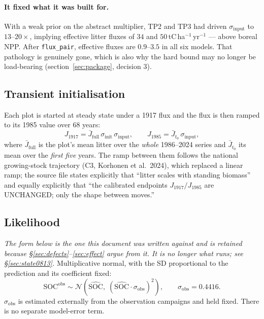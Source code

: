 \documentclass[11pt]{article}
\newcommand{\sinit}{\sigma_{\mathrm{init}}}
\newcommand{\sinput}{\sigma_{\mathrm{input}}}
\newcommand{\sobs}{\sigma_{\mathrm{obs}}}
\newcommand{\Jfull}{\bar{J}_{\mathrm{full}}}
\newcommand{\Jto}{\bar{J}_{t_0}}
\begin{document}
\paragraph{It fixed what it was built for.} With a weak prior on the abstract multiplier, TP2 and
TP3 had driven $\sinput$ to $13$--$20\times$, implying effective litter fluxes of $34$ and
$50$\,tC\,ha$^{-1}$\,yr$^{-1}$ --- above boreal NPP. After \texttt{flux\_pair}, effective fluxes
are $0.9$--$3.5$ in all six models. That pathology is genuinely gone, which is also why the hard
bound may no longer be load-bearing (section~\ref{sec:package}, decision 3).

\subsection{Transient initialisation}
Each plot is started at steady state under a 1917 flux and the flux is then ramped to its 1985
value over 68 years:
\begin{equation}
J_{1917} = \Jfull \,\sinit\, \sinput, \qquad
J_{1985} = \Jto \, \sinput,
\label{eq:anchors}
\end{equation}
where $\Jfull$ is the plot's mean litter over the \emph{whole} 1986--2024 series and $\Jto$ its
mean over the \emph{first five} years. The ramp between them follows the national growing-stock
trajectory (C3, Korhonen et al.\ 2024), which replaced a linear ramp; the source file states
explicitly that ``litter scales with standing biomass'' and equally explicitly that ``the
calibrated endpoints $J_{1917}/J_{1985}$ are UNCHANGED; only the shape between moves.''

\subsection{Likelihood}
\emph{The form below is the one this document was written against and is retained because
\S\ref{sec:defects}--\ref{sec:effect} argue from it. It is no longer what runs; see
\S\ref{sec:state0813}.}
Multiplicative normal, with the SD proportional to the prediction and its coefficient fixed:
\begin{equation}
\mathrm{SOC}^{\mathrm{obs}} \sim \mathcal{N}\!\left(\widehat{\mathrm{SOC}},\;
\left(\widehat{\mathrm{SOC}}\cdot\sobs\right)^{2}\right), \qquad \sobs = 0.4416 .
\label{eq:lik}
\end{equation}
$\sobs$ is estimated externally from the observation campaigns and held fixed. There is no
separate model-error term.
\end{document}
